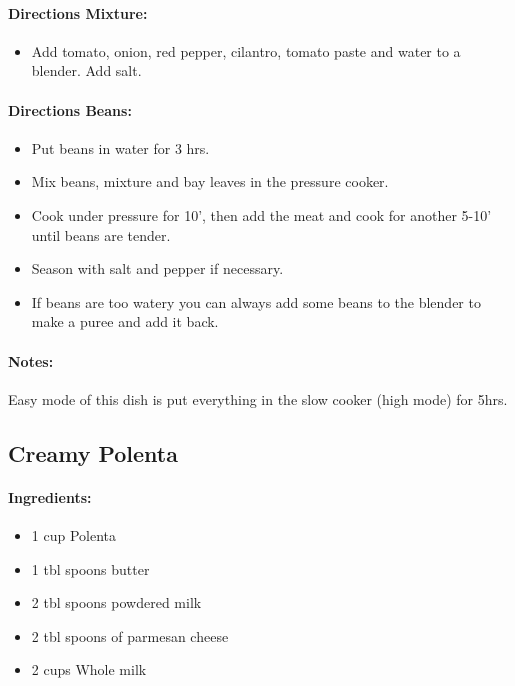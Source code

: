 \documentclass{article}
\begin{document}
\paragraph{Directions Mixture:}
\begin{itemize}
	\item Add tomato, onion, red pepper, cilantro, tomato paste and water to a blender. Add salt.
\end{itemize}

\paragraph{Directions Beans:}
\begin{itemize}
	\item Put beans in water for 3 hrs.
	\item Mix beans, mixture and bay leaves in the pressure cooker.
	\item Cook under pressure for 10', then add the meat and cook for another 5-10' until beans are tender.
	\item Season with salt and pepper if necessary.
	\item If beans are too watery you can always add some beans to the blender to make a puree and add it back.
\end{itemize}

\paragraph{Notes:}
Easy mode of this dish is put everything in the slow cooker (high mode) for 5hrs.

\subsection{Creamy Polenta}

\paragraph{Ingredients:}

\begin{itemize}
	\item 1 cup Polenta
	\item 1 tbl spoons butter
	\item 2 tbl spoons powdered milk
	\item 2 tbl spoons of parmesan cheese
	\item 2 cups Whole milk
\end{itemize}
\end{document}
